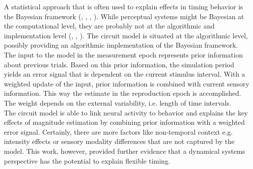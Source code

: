 \documentclass[10pt]{article}
\begin{document}
A statistical approach that is often used to explain effects in timing behavior is the Bayesian framework (\cite{Petzschner2012}, \cite{Shi2013}, \cite{Petzschner2015}, \cite{Sohn2019}).
While perceptual systems might be Bayesian at the computational level, they are probably not at the algorithmic and implementation level (\cite{marr1976}, \cite{Block2018}, \cite{Kwisthout2020}).
The circuit model is situated at the algorithmic level, possibly providing an algorithmic implementation of the Bayesian framework. %
The input to the model in the measurement epoch represents prior information about previous trials. Based on this prior information, the simulation period yields an error signal that is dependent on the current stimulus interval. With a weighted update of the input, prior information is combined with current sensory information. This way the estimate in the reproduction epoch is accomplished. The weight depends on the external variability, i.e. length of time intervals. \\

The circuit model is able to link neural activity to behavior and explains the key effects of magnitude estimation by combining prior information with a weighted error signal. 
Certainly, there are more factors like non-temporal context e.g. intensity effects or sensory modality differences that are not captured by the model.
This work, however, provided further evidence that a dynamical systems perspective has the potential to explain flexible timing.


\end{document}
